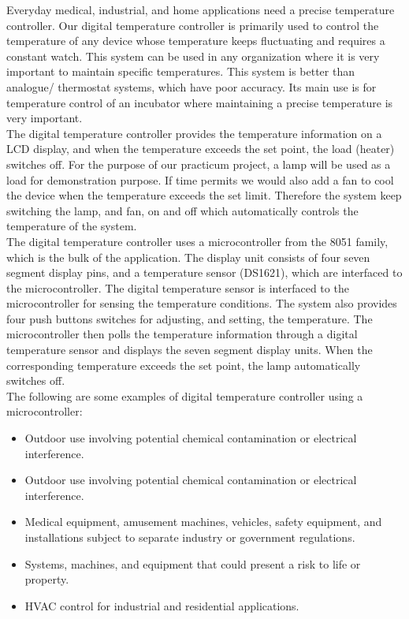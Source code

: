 \documentclass[11pt]{article}
\begin{document}
Everyday medical, industrial, and home applications need a precise temperature controller. Our digital temperature controller is primarily used to control the temperature of any device whose temperature keeps fluctuating and requires a constant watch. This system can be used in any organization where it is very important to maintain specific temperatures. This system is better than analogue/ thermostat systems, which have poor accuracy. Its main use is for temperature control of an incubator where maintaining a precise temperature is very important.\\

The digital temperature controller provides the temperature information on a LCD display, and when the temperature exceeds the set point, the load (heater) switches off. For the purpose of our practicum project, a lamp will be used as a load for demonstration purpose. If time permits we would also add a fan to cool the device when the temperature exceeds the set limit. Therefore the system keep switching the lamp, and fan, on and off which automatically controls the temperature of the system.\\

The digital temperature controller uses a microcontroller from the 8051 family, which is the bulk of the application. The display unit consists of four seven segment display pins, and a temperature sensor (DS1621), which are interfaced to the microcontroller. The digital temperature sensor is interfaced to the microcontroller for sensing the temperature conditions. The system also provides four push buttons switches for adjusting, and setting, the temperature. The microcontroller then polls the temperature information through a digital temperature sensor and displays the seven segment display units. When the corresponding temperature exceeds the set point, the lamp automatically switches off.\\

The following are some examples of digital temperature controller using a microcontroller:
\begin{itemize}
    \item Outdoor use involving potential chemical contamination or electrical interference.
    \item Outdoor use involving potential chemical contamination or electrical interference.
    \item Medical equipment, amusement machines, vehicles, safety equipment, and installations subject to separate industry or government regulations.
    \item Systems, machines, and equipment that could present a risk to life or property.
    \item HVAC control for industrial and residential applications.
\end{itemize}
\end{document}
